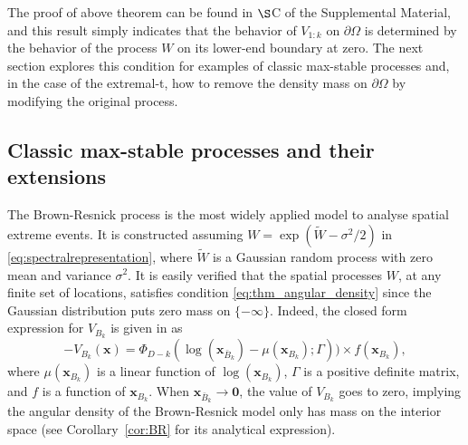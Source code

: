 \documentclass[12pt]{article}
\begin{document}
The proof of above theorem can be found in $\S$C of the Supplemental Material, and this result simply indicates that the behavior of $V_{1:k}$ on $\partial\Omega$ is determined by the behavior of the process $W$ on its lower-end boundary at zero. The next section 
explores this condition for
examples of classic max-stable processes and, in the case of the extremal-t, how to remove the density mass on $\partial\Omega$ by modifying the original process.   

\subsection{Classic max-stable processes and their extensions}

The Brown-Resnick process is the most widely applied model to analyse spatial extreme events.
It is constructed assuming $W=\exp(\tilde W - \sigma^2/2)$ in \eqref{eq:spectralrepresentation}, where $\tilde W$ is a Gaussian random process with zero mean and variance $\sigma^2$. It is easily verified that the spatial processes $W$, at any finite set of locations, satisfies condition \eqref{eq:thm_angular_density} since the Gaussian distribution puts zero mass on $\{-\infty\}$. Indeed, the closed form expression for $V_{B_k}$ is given in \cite{Wadsworth.Tawn:2014} as
$$-V_{B_k}(\bm x) = \Phi_{D-k}(\log(\bm x_{\bar{B}_k}) - \mu(\bm x_{B_k});\Gamma))\times f(\bm x_{B_k}),$$
where $\mu(\bm x_{B_k})$ is a linear function of $\log(\bm x_{B_k})$, $\Gamma$ is a positive definite matrix, and $f$ is a function of $\bm x_{B_k}$. When $\bm x_{\bar{B}_k}\to \bm 0$, the value of $V_{B_k}$ goes to zero, implying the angular density of the Brown-Resnick model only has mass on the interior space (see Corollary~\ref{cor:BR} for its analytical expression).
\end{document}
